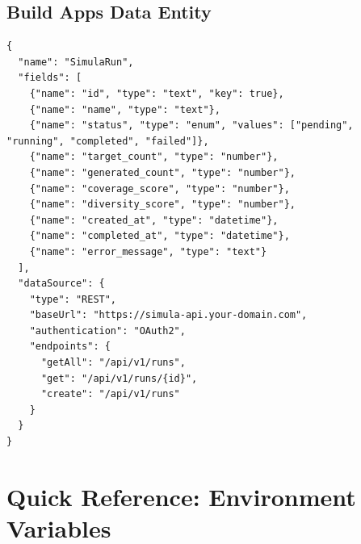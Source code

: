 \subsection{Build Apps Data Entity}

\begin{lstlisting}[language=jsonx,caption={Build Apps data entity for generation runs}]
{
  "name": "SimulaRun",
  "fields": [
    {"name": "id", "type": "text", "key": true},
    {"name": "name", "type": "text"},
    {"name": "status", "type": "enum", "values": ["pending", "running", "completed", "failed"]},
    {"name": "target_count", "type": "number"},
    {"name": "generated_count", "type": "number"},
    {"name": "coverage_score", "type": "number"},
    {"name": "diversity_score", "type": "number"},
    {"name": "created_at", "type": "datetime"},
    {"name": "completed_at", "type": "datetime"},
    {"name": "error_message", "type": "text"}
  ],
  "dataSource": {
    "type": "REST",
    "baseUrl": "https://simula-api.your-domain.com",
    "authentication": "OAuth2",
    "endpoints": {
      "getAll": "/api/v1/runs",
      "get": "/api/v1/runs/{id}",
      "create": "/api/v1/runs"
    }
  }
}
\end{lstlisting}


\section{Quick Reference: Environment Variables}

